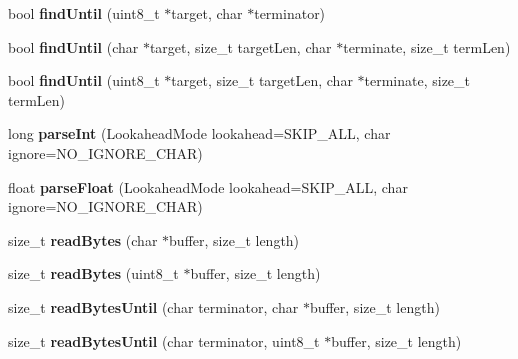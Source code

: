 \begin{DoxyCompactItemize}
\item 
\mbox{\label{class_stream_a167c5236fd76df40d4894aa48e99aa98}} 
bool {\bfseries find\+Until} (uint8\+\_\+t $\ast$target, char $\ast$terminator)
\item 
\mbox{\label{class_stream_a3a9497de614792103ab8cb4759e01a69}} 
bool {\bfseries find\+Until} (char $\ast$target, size\+\_\+t target\+Len, char $\ast$terminate, size\+\_\+t term\+Len)
\item 
\mbox{\label{class_stream_ae644144154e17da36a1b89123847b5b1}} 
bool {\bfseries find\+Until} (uint8\+\_\+t $\ast$target, size\+\_\+t target\+Len, char $\ast$terminate, size\+\_\+t term\+Len)
\item 
\mbox{\label{class_stream_a8875d87ed4db36c36990b2fb22ca48da}} 
long {\bfseries parse\+Int} (Lookahead\+Mode lookahead=S\+K\+I\+P\+\_\+\+A\+LL, char ignore=N\+O\+\_\+\+I\+G\+N\+O\+R\+E\+\_\+\+C\+H\+AR)
\item 
\mbox{\label{class_stream_a685133574afc1c35223e31703543a0a7}} 
float {\bfseries parse\+Float} (Lookahead\+Mode lookahead=S\+K\+I\+P\+\_\+\+A\+LL, char ignore=N\+O\+\_\+\+I\+G\+N\+O\+R\+E\+\_\+\+C\+H\+AR)
\item 
\mbox{\label{class_stream_a45fd1336a323ea83b16e8507055f44ea}} 
size\+\_\+t {\bfseries read\+Bytes} (char $\ast$buffer, size\+\_\+t length)
\item 
\mbox{\label{class_stream_a23dd7428e78e86ff41fce45bd618e214}} 
size\+\_\+t {\bfseries read\+Bytes} (uint8\+\_\+t $\ast$buffer, size\+\_\+t length)
\item 
\mbox{\label{class_stream_af84672a4fb2620466958d3118d4fea00}} 
size\+\_\+t {\bfseries read\+Bytes\+Until} (char terminator, char $\ast$buffer, size\+\_\+t length)
\item 
\mbox{\label{class_stream_a432e1b8520b03a845264789fcb9c1a10}} 
size\+\_\+t {\bfseries read\+Bytes\+Until} (char terminator, uint8\+\_\+t $\ast$buffer, size\+\_\+t length)
\item 
\mbox{\label{class_stream_a1c60bdda2b65d78e5a1362d51b856c5a}} 

\end{DoxyCompactItemize}
